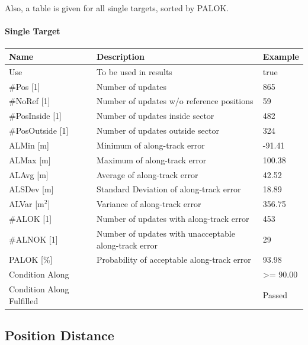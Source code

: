 Also, a table is given for all single targets, sorted by PALOK.

\paragraph{Single Target}

\begin{center}
 \begin{table}[H]
  \begin{tabularx}{\textwidth}{ | l | X |  l | }
    \hline
    \textbf{Name} & \textbf{Description} & \textbf{Example} \\ \hline
    Use & To be used in results & true \\ \hline
    \#Pos [1] & Number of updates & 865 \\ \hline
    \#NoRef [1] & Number of updates w/o reference positions & 59 \\ \hline
    \#PosInside [1] & Number of updates inside sector & 482 \\ \hline
    \#PosOutside [1] & Number of updates outside sector & 324 \\ \hline
    ALMin [m] & Minimum of along-track error & -91.41 \\ \hline
    ALMax [m] & Maximum of along-track error & 100.38 \\ \hline
    ALAvg [m] & Average of along-track error & 42.52 \\ \hline
    ALSDev [m] & Standard Deviation of along-track error & 18.89 \\ \hline
    ALVar [m$^2$] & Variance of along-track error & 356.75 \\ \hline
    \#ALOK [1] & Number of updates with along-track error & 453 \\ \hline
    \#ALNOK [1] & Number of updates with unacceptable along-track error  & 29 \\ \hline
    PALOK [\%] & Probability of acceptable along-track error & 93.98 \\ \hline
    Condition Along &  & >= 90.00 \\ \hline
    Condition Along Fulfilled &  & Passed \\ \hline
\end{tabularx}
\end{table}
\end{center}

\subsection{Position Distance}
\label{sec:eval_req_pos_distance} 

